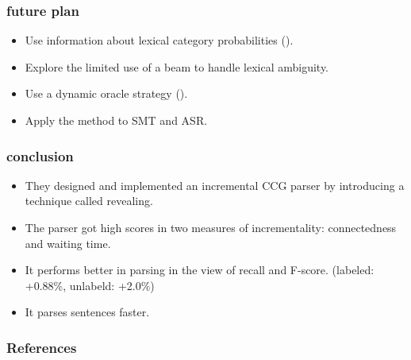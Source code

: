 \documentclass[10pt,usepdftitle=false,hyperref={unicode}]{beamer}
\begin{document}
\begin{frame}
    \frametitle{future plan}
    \begin{itemize}
        \item Use information about lexical category probabilities (\cite{auli2011}).

        \item Explore the limited use of a beam to handle lexical ambiguity.
        \item Use a dynamic oracle strategy (\cite{xu2014}).
        \item Apply the method to SMT and ASR.
    \end{itemize}
\end{frame}

\begin{frame}
    \frametitle{conclusion}
    \begin{itemize}
        \item They designed and implemented an incremental CCG parser by introducing a technique called revealing.
        \item The parser got high scores in two measures of incrementality: connectedness and waiting time.
        \item It performs better in parsing in the view of recall and F-score. (labeled: +0.88\%, unlabeld: +2.0\%)
        \item It parses sentences faster.
    \end{itemize}
\end{frame}

\begin{frame}
  \frametitle{References}

  
  

\end{frame}
\end{document}
